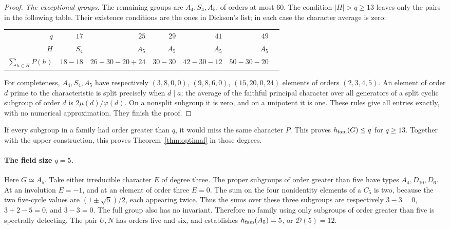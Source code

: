 \documentclass[11pt]{article}
\theoremstyle{remark}\newtheorem{remark}[theorem]{Remark}
\begin{document}
\begin{proof}
\emph{The exceptional groups.}
The remaining groups are $A_4,S_4,A_5$, of orders at most $60$.
The condition $|H|>q\ge13$ leaves only the pairs in the following table.
Their existence conditions are the ones in Dickson's list; in each case
the character average is zero:
\begin{center}
\begin{tabular}{@{}rrrrrrr@{}}\toprule
$q$&$17$&$25$&$29$&$41$&$49$\\
$H$&$S_4$&$A_5$&$A_5$&$A_5$&$A_5$\\
$\sum_{h\in H}P(h)$&$18-18$&$26-30-20+24$&$30-30$
 &$42-30-12$&$50-30-20$\\\bottomrule
\end{tabular}
\end{center}
For completeness, $A_4,S_4,A_5$ have respectively
$(3,8,0,0)$, $(9,8,6,0)$, $(15,20,0,24)$ elements of orders
$(2,3,4,5)$. An element of order $d$ prime to the characteristic is
split precisely when $d\mid a$; the average of the faithful principal
character over all generators of a split cyclic subgroup of order $d$
is $2\mu(d)/\varphi(d)$. On a nonsplit subgroup it is zero, and on a
unipotent it is one. These rules give all entries exactly, with no
numerical approximation. They finish the proof.
\end{proof}

If every subgroup in a family had order greater than $q$, it would miss
the same character $P$. This proves $h_{\rm fam}(G)\le q$ for $q\ge13$.
Together with the upper construction, this proves
Theorem~\ref{thm:optimal} in those degrees.

\paragraph{The field size $q=5$.}
Here $G\simeq A_5$. Take either irreducible character $E$ of degree three.
The proper subgroups of order greater than five have types $A_4,D_{10},
D_6$. At an involution $E=-1$, and at an element of order three $E=0$.
The sum on the four nonidentity elements of a $C_5$ is two, because the
two five-cycle values are $(1\pm\sqrt5)/2$, each appearing twice.
Thus the sums over these three subgroups are respectively
$3-3=0$, $3+2-5=0$, and $3-3=0$.
The full group also has no invariant. Therefore no family using only
subgroups of order greater than five is spectrally detecting.
The pair $U,N$ has orders five and six, and establishes
$h_{\rm fam}(A_5)=5$, or $\mathcal D(5)=12$.
\end{document}

